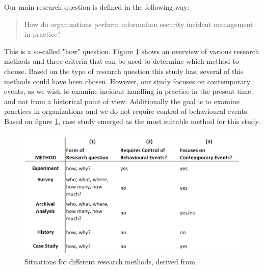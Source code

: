Our main research question is defined in the following way:

\begin{quote}
How do organizations perform information security incident management in practice?
\end{quote}

This is a so-called "how" question. Figure \ref{fig:methods} shows an overview of various research methods and three criteria that can be used to determine which method to choose. Based on the type of research question this study has, several of this methods could have been chosen. However, our study focuses on contemporary events, as we wish to examine incident handling in practice in the present time, and not from a historical point of view. Additionally the goal is to examine practices in organizations and we do not require control of behavioural events. Based on figure \ref{fig:methods}, case study emerged as the most suitable method for this study.

\begin{figure}[H]
\begin{center}
\includegraphics[scale=0.35]{methods.png}
\caption[Situations for different research methods]{Situations for different research methods, derived from \cite{CaseStudyResearch}}
\label{fig:methods}
\end{center}
\end{figure}